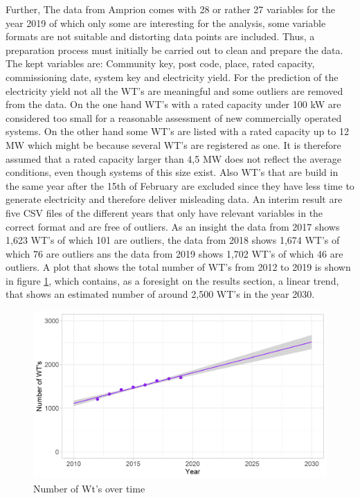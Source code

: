 \documentclass[a4paper,11pt]{article}
\begin{document}
Further, The data from Amprion comes with 28 or rather 27 variables for the year 2019 of which only some are interesting for the analysis, some variable formats are not suitable and distorting data points are included. Thus, a preparation process must initially be carried out to clean and prepare the data. The kept variables are: Community key, post code, place, rated capacity, commissioning date, system key and electricity yield. For the prediction of the electricity yield not all the WT's are meaningful and some outliers are removed from the data. On the one hand WT's with a rated capacity under 100 kW are considered too small for a reasonable assessment of new commercially operated systems. On the other hand some WT's are listed with a rated capacity up to 12 MW which might be because several WT's are registered as one. It is therefore assumed that a rated capacity larger than 4,5 MW does not reflect the average conditions, even though systems of this size exist. Also WT's that are build in the same year after the 15th of February are excluded since they have less time to generate electricity and therefore deliver misleading data. An interim result are five CSV files of the different years that only have relevant variables in the correct format and are free of outliers. As an insight the data from 2017 shows 1,623 WT's of which 101 are outliers, the data from 2018 shows 1,674 WT's of which 76 are outliers ans the data from 2019 shows 1,702 WT's of which 46 are outliers. A plot that shows the total number of WT's from 2012 to 2019 is shown in figure \ref{fig:yearswts}, which contains, as a foresight on the results section, a linear trend, that shows an estimated number of around 2,500 WT's in the year 2030.
\begin{figure}

{\centering \includegraphics[width=1\linewidth]{data/Amprion/results_of_analysis/year_wts} 

}

\caption{Number of Wt's over time}\label{fig:yearswts}
\end{figure}
\end{document}
